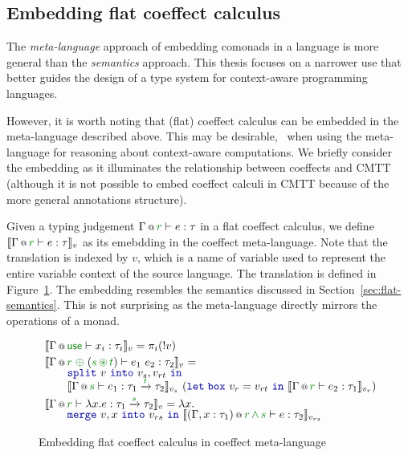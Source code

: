 
\subsection{Embedding flat coeffect calculus}

The \emph{meta-language} approach of embedding comonads in a language is more general than the
\emph{semantics} approach. This thesis focuses on a narrower use that better guides the design of
a type system for context-aware programming languages. 

However, it is worth noting that 
(flat) coeffect calculus can be embedded in the meta-language described above. This may be 
desirable, \eg~when using the meta-language for reasoning about context-aware computations. 
We briefly consider the embedding as it illuminates the relationship between coeffects and
CMTT (although it is not possible to embed coeffect calculi in CMTT because of the more general
annotations structure).

Given a typing judgement $\coctx{\Gamma}{\cclrd{r}} \vdash e : \tau$ in a flat coeffect calculus,
we define $\sem{\coctx{\Gamma}{\cclrd{r}} \vdash e : \tau}_v$ as its emebdding in the coeffect
meta-language. Note that the translation is indexed by $v$, which is a name of variable used 
to represent the entire variable context of the source language. The translation is defined in
Figure~\ref{fig:conclusions-embed}. The embedding resembles the semantics discussed in 
Section~\ref{sec:flat-semantics}. This is not surprising as the meta-language directly mirrors
the operations of a monad.


\begin{figure}[t]
\begin{equation*}
\begin{array}{l}
 \sem{ \coctx{\Gamma}{\cunit}\vdash x_i : \tau_i }_v = \pi_i (!v) \\[0.25em]
 \sem{ \coctx{\Gamma}{\cclrd{r}\;\cpar\;(\cclrd{s}\,\cseq\,\cclrd{t})} \vdash e_1~e_2 : \tau_2 }_v =\\[-0.25em]
   \qquad \kvd{split}~v~\kvd{into}~v_s, v_{rt}~\kvd{in} \\[-0.25em]
   \qquad \sem{ \coctx{\Gamma}{\cclrd{s}} \vdash e_1 : \tau_1 \xrightarrow{\cclrd{t}} \tau_2 }_{v_s}
      ~(\kvd{let\;box}~v_r = v_{rt}~\kvd{in}~\sem{ \coctx{\Gamma}{\cclrd{r}} \vdash e_2 : \tau_1}_{v_r}) \\[0.25em]
 \sem{ \coctx{\Gamma}{\cclrd{r}} \vdash \lambda x.e:\tau_1 \xrightarrow{\cclrd{s}} \tau_2 }_v = \lambda x. \\[-0.25em]
   \qquad \kvd{merge}~v,x~\kvd{into}~v_{rs}~\kvd{in}~\sem{ \coctx{(\Gamma,x:\tau_1)}{\cclrd{r}\,\czip\,\cclrd{s}} \vdash e : \tau_2 }_{v_{rs}}
\end{array}
\end{equation*}
\caption{Embedding flat coeffect calculus in coeffect meta-language }
\label{fig:conclusions-embed}
\end{figure}



